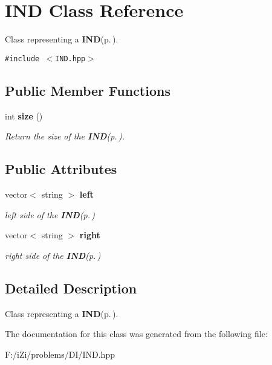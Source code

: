 \section{IND Class Reference}
\label{class_i_n_d}
Class representing a {\bf IND}{\rm (p.\,\pageref{class_i_n_d})}.  


{\tt \#include $<$IND.hpp$>$}

\subsection*{Public Member Functions}
\begin{CompactItemize}
\item 
int {\bf size} ()\label{class_i_n_d_b18ab142c3d20be97b0782b568c8a2a6}

\begin{CompactList}\small\item\em Return the size of the {\bf IND}{\rm (p.\,\pageref{class_i_n_d})}. \item\end{CompactList}\end{CompactItemize}
\subsection*{Public Attributes}
\begin{CompactItemize}
\item 
vector$<$ string $>$ {\bf left}\label{class_i_n_d_0fd6f015101c07bf3e59108d5d62a7c8}

\begin{CompactList}\small\item\em left side of the {\bf IND}{\rm (p.\,\pageref{class_i_n_d})} \item\end{CompactList}\item 
vector$<$ string $>$ {\bf right}\label{class_i_n_d_e9bcd3588ce512c15c5cf0a618402154}

\begin{CompactList}\small\item\em right side of the {\bf IND}{\rm (p.\,\pageref{class_i_n_d})} \item\end{CompactList}\end{CompactItemize}


\subsection{Detailed Description}
Class representing a {\bf IND}{\rm (p.\,\pageref{class_i_n_d})}. 



The documentation for this class was generated from the following file:\begin{CompactItemize}
\item 
F:/i\-Zi/problems/DI/IND.hpp\end{CompactItemize}
